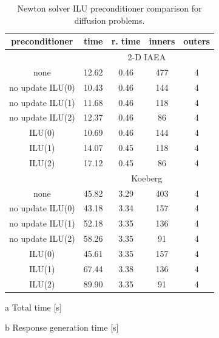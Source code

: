 \begin{table}[ht] 
 \begin{center} 
 
 \begin{threeparttable}

 \begin{tabular}{ccccc} 
 \toprule 
  preconditioner & time\tnote{a} & r. time\tnote{b} & inners & outers \\
 \midrule 
 &  \multicolumn{4}{c}{2-D IAEA} \\ 
 \midrule 
          none &     12.62 &      0.46 &          477 &            4 \\ 
  no update ILU(0) &     10.43 &      0.46 &          144 &            4 \\ 
  no update ILU(1) &     11.68 &      0.46 &          118 &            4 \\ 
  no update ILU(2) &     12.37 &      0.46 &           86 &            4 \\ 
        ILU(0) &     10.69 &      0.46 &          144 &            4 \\ 
        ILU(1) &     14.07 &      0.45 &          118 &            4 \\ 
        ILU(2) &     17.12 &      0.45 &           86 &            4 \\ 
 \midrule 
 &  \multicolumn{4}{c}{Koeberg} \\ 
 \midrule 
          none &     45.82 &      3.29 &          403 &            4 \\ 
  no update ILU(0) &     43.18 &      3.34 &          157 &            4 \\ 
  no update ILU(1) &     52.18 &      3.35 &          136 &            4 \\ 
  no update ILU(2) &     58.26 &      3.35 &           91 &            4 \\ 
        ILU(0) &     45.61 &      3.35 &          157 &            4 \\ 
        ILU(1) &     67.44 &      3.38 &          136 &            4 \\ 
        ILU(2) &     89.90 &      3.35 &           91 &            4 \\ 
 \bottomrule 
 \end{tabular} 
 

 {\footnotesize
 \begin{tablenotes}
   \item[a] Total time [s]
   \item[b] Response generation time [s]
 \end{tablenotes}
 }
 \end{threeparttable}
 
 
 \end{center} 
 \caption{Newton solver ILU preconditioner comparison for diffusion 
          problems.} 
 \label{tbl:diffusion_newton_pc_study} 
\end{table} 

